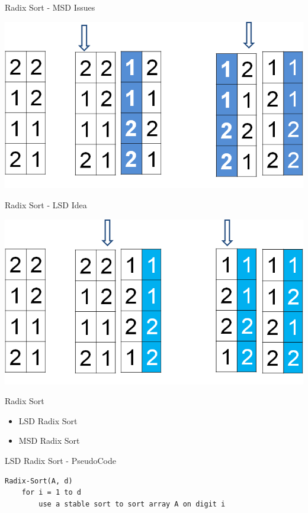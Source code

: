 \documentclass{beamer}
\begin{document}
\begin{frame}{Radix Sort - MSD Issues}
\begin{center}
    \includegraphics[scale=0.4]{msdRadixSortErr.png}
\end{center}
\end{frame}


\begin{frame}{Radix Sort - LSD Idea}
\begin{center}
    \includegraphics[scale=0.4]{lsdRadixSortEg.png}
\end{center}
\end{frame}


\begin{frame}{Radix Sort}
\begin{itemize}
    \item LSD Radix Sort
    \item MSD Radix Sort
\end{itemize}
\end{frame}


\begin{frame}[fragile]{LSD Radix Sort - PseudoCode}
\begin{verbatim}
Radix-Sort(A, d)
    for i = 1 to d
        use a stable sort to sort array A on digit i
\end{verbatim}
\end{frame}
\end{document}
